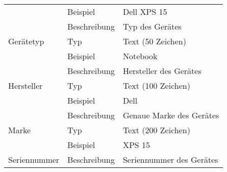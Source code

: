 \documentclass[a4paper]{scrartcl}
\begin{document}
\begin{tabularx}{\textwidth}{ll X}
    & Beispiel & Dell XPS 15 \\
    \multirow{3}{*}{Gerätetyp} & Beschreibung & Typ des Gerätes \\
    & Typ & Text (50 Zeichen) \\
    & Beispiel & Notebook \\
    \multirow{3}{*}{Hersteller} & Beschreibung & Hersteller des Gerätes \\
    & Typ & Text (100 Zeichen) \\
    & Beispiel & Dell \\
    \multirow{3}{*}{Marke} & Beschreibung & Genaue Marke des Gerätes \\
    & Typ & Text (200 Zeichen) \\
    & Beispiel & XPS 15 \\
    \multirow{3}{*}{Seriennummer} & Beschreibung & Seriennummer des Gerätes \\
  \end{tabularx}
\end{document}
